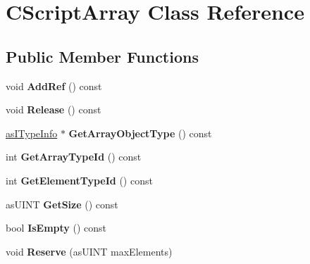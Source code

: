 \hypertarget{class_c_script_array}{}\section{C\+Script\+Array Class Reference}
\label{class_c_script_array}
\subsection*{Public Member Functions}
\begin{DoxyCompactItemize}
\item 
\mbox{\label{class_c_script_array_a23d70e828e8bee3c9dce09e602836086}} 
void {\bfseries Add\+Ref} () const
\item 
\mbox{\label{class_c_script_array_ade6e4b39fda93c29304563f5647a5677}} 
void {\bfseries Release} () const
\item 
\mbox{\label{class_c_script_array_acc2b8af2504d9b4effef5012bd6f3940}} 
\hyperlink{classas_i_type_info}{as\+I\+Type\+Info} $\ast$ {\bfseries Get\+Array\+Object\+Type} () const
\item 
\mbox{\label{class_c_script_array_a39c5bdd243adf6b2a3236d10cb0dc00c}} 
int {\bfseries Get\+Array\+Type\+Id} () const
\item 
\mbox{\label{class_c_script_array_aea5620585756a886e658c651bcae4b7b}} 
int {\bfseries Get\+Element\+Type\+Id} () const
\item 
\mbox{\label{class_c_script_array_a9ee3347ed075a05718e3946032d4c117}} 
as\+U\+I\+NT {\bfseries Get\+Size} () const
\item 
\mbox{\label{class_c_script_array_a2577f61bf0fa86ac4602d0b909098857}} 
bool {\bfseries Is\+Empty} () const
\item 
\mbox{\label{class_c_script_array_ae0b270ff8220f9678a5a7d572abf495d}} 
void {\bfseries Reserve} (as\+U\+I\+NT max\+Elements)
\item 
\mbox{\label{class_c_script_array_a54fe13adf1cdded2aec4ac0b5924891f}} 

\end{DoxyCompactItemize}
